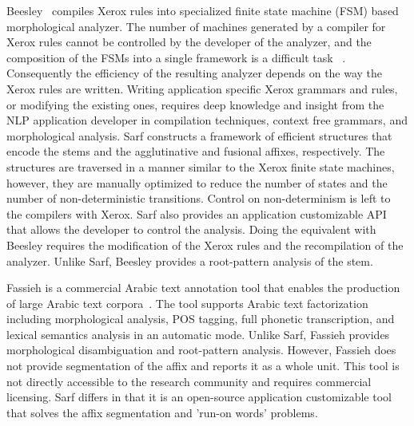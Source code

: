 
Beesley~\citep{Beesley:03} compiles 
Xerox rules into specialized finite state
machine (FSM) based morphological analyzer.
The number of machines 
generated by a compiler for Xerox rules cannot be controlled by the developer of the analyzer, 
and the composition of the FSMs into a single framework is a difficult task 
~\citep{Beesley:01}.
Consequently the efficiency of the resulting analyzer depends on the
way the Xerox rules are written. 
Writing application specific Xerox grammars and rules, or modifying the existing ones, 
requires deep knowledge and insight from the NLP application developer
in compilation techniques, context free grammars, 
and morphological analysis. 
Sarf constructs a framework of efficient structures %
that encode the stems and the agglutinative and fusional affixes, respectively.
The structures are traversed in a manner similar to the Xerox finite state machines, 
however, they are manually optimized to reduce the number of states and the 
number of non-deterministic transitions. 
Control on non-determinism is left to the compilers with Xerox.
Sarf also provides an application customizable API that allows the developer 
to control the analysis. 
Doing the equivalent with Beesley 
requires the modification of the Xerox rules and 
the recompilation of the analyzer.
Unlike Sarf, Beesley provides a root-pattern analysis of the stem.

Fassieh is a commercial Arabic text annotation tool that 
enables the production of large Arabic text corpora~\citep{attia2009fassieh}.
The tool supports Arabic text factorization including 
morphological analysis, POS tagging, full phonetic transcription, 
and lexical semantics analysis in an automatic mode. 
Unlike Sarf, Fassieh provides morphological 
disambiguation and root-pattern analysis. 
However, Fassieh does not provide segmentation of the affix 
and reports it as a whole unit. 
This tool is not directly accessible to the research community 
and requires commercial licensing. 
Sarf differs in that it is an open-source application 
customizable tool that solves the affix segmentation and 'run-on words' problems. 

